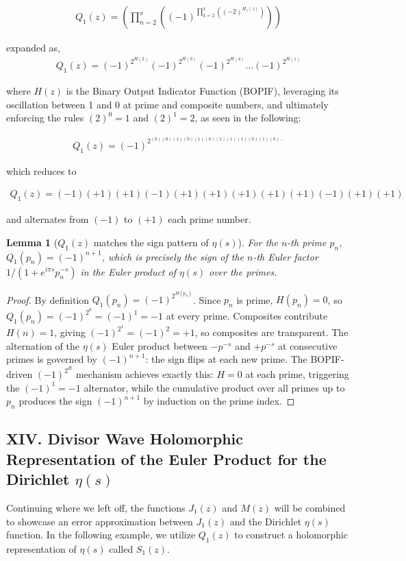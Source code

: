 \documentclass{article}
\newtheorem{lemma}{Lemma}
\begin{document}
\begin{align*}
Q_1(z) = \left( \prod_{n=2}^x \left( (-1)^{\prod_{k=2}^x \left( (-2)^{H_1(z)} \right)} \right) \right)
\end{align*}

expanded as,
\begin{align*}
	Q_1(z) = (-1)^{2^{H(2)}}(-1)^{2^{H(3)}}(-1)^{2^{H(4)}}\ldots(-1)^{2^{H(z)}}
\end{align*}

where $H(z)$ is the Binary Output Indicator Function (BOPIF), leveraging its oscillation between 1 and 0 at prime and composite numbers, and ultimately enforcing the rules $(2)^{0}=1$ and $(2)^{1}=2$, as seen in the following:

\begin{align*}
	Q_1(z) = (-1)^{2^{(0)(0)(1)(0)(1)(0)(1)(1)(1)(0)(1)(0)\ldots}}
\end{align*}

which reduces to

\begin{align*}
	Q_1(z) = (-1)(+1)(+1)(-1)(+1)(+1)(+1)(+1)(+1)(-1)(+1)(+1)
\end{align*}

and alternates from $(-1)$ to $(+1)$ each prime number.

\begin{lemma}[$Q_1(z)$ matches the sign pattern of $\eta(s)$]
For the $n$-th prime $p_n$, $Q_1(p_n) = (-1)^{n+1}$, which is precisely the sign of the $n$-th Euler factor $1/(1 + e^{i\pi s} p_n^{-s})$ in the Euler product of $\eta(s)$ over the primes.
\end{lemma}
\begin{proof}
By definition $Q_1(p_n) = (-1)^{2^{H(p_n)}}$. Since $p_n$ is prime, $H(p_n) = 0$, so $Q_1(p_n) = (-1)^{2^0} = (-1)^1 = -1$ at every prime. Composites contribute $H(n) = 1$, giving $(-1)^{2^1} = (-1)^2 = +1$, so composites are transparent. The alternation of the $\eta(s)$ Euler product between $-p^{-s}$ and $+p^{-s}$ at consecutive primes is governed by $(-1)^{n+1}$: the sign flips at each new prime. The BOPIF-driven $(-1)^{2^{H}}$ mechanism achieves exactly this: $H = 0$ at each prime, triggering the $(-1)^1 = -1$ alternator, while the cumulative product over all primes up to $p_n$ produces the sign $(-1)^{n+1}$ by induction on the prime index.
\end{proof}

\newpage
\newpage
\subsection{XIV. Divisor Wave Holomorphic Representation of the Euler Product for the Dirichlet $\eta(s)$}
Continuing where we left off, the functions $J_1(z)$ and $M(z)$ will be combined to showcase an error approximation between $J_1(z)$ and the Dirichlet $\eta(s)$ function. In the following example, we utilize $Q_1(z)$ to construct a holomorphic representation of $\eta(s)$ called $S_1(z)$.
\end{document}
